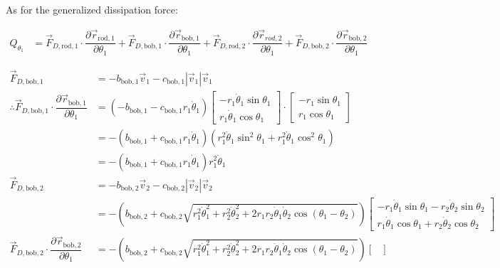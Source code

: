 \documentclass[12pt,a4paper,portrait]{article}
\begin{document}
	As for the generalized dissipation force:
	
	\begin{align*}
		Q_{\theta_1} &= \vec{F}_{D, \mathrm{rod}, 1} \cdot \dfrac{\partial \vec{r}_{\mathrm{rod},1}}{\partial \theta_1} + \vec{F}_{D, \mathrm{bob}, 1} \cdot \dfrac{\partial \vec{r}_{\mathrm{bob},1}}{\partial \theta_1}+ \vec{F}_{D, \mathrm{rod}, 2} \cdot \dfrac{\partial \vec{r}_{rod, 2}}{\partial \theta_1} + \vec{F}_{D, \mathrm{bob}, 2} \cdot \dfrac{\partial \vec{r}_{\mathrm{bob}, 2}}{\partial \theta_1}
	\end{align*}
	
	\begin{align*}
		\vec{F}_{D,\mathrm{bob}, 1} &= -b_{\mathrm{bob}, 1}\vec{v}_1 - c_{\mathrm{bob}, 1}|\vec{v}_1|\vec{v}_1\\
		\therefore \vec{F}_{D, \mathrm{bob}, 1} \cdot \dfrac{\partial \vec{r}_{\mathrm{bob},1}}{\partial \theta_1}&= (-b_{\mathrm{bob}, 1} - c_{\mathrm{bob}, 1}r_1\dot{\theta}_1)\begin{bmatrix}
			-r_1\dot{\theta}_1 \sin{\theta_1} \\
			r_1\dot{\theta}_1 \cos{\theta_1}
			\end{bmatrix} \cdot \begin{bmatrix}
			-r_1 \sin{\theta_1} \\
			r_1 \cos{\theta_1}
		\end{bmatrix} \\
		&= -(b_{\mathrm{bob}, 1}+c_{\mathrm{bob}, 1}r_1\dot{\theta}_1) (r_1^2 \dot{\theta}_1 \sin^2{\theta_1}+r_1^2 \dot{\theta}_1 \cos^2{\theta_1}) \\
		&= -(b_{\mathrm{bob}, 1} + c_{\mathrm{bob}, 1} r_1 \dot{\theta}_1)r_1^2 \dot{\theta}_1 \\
		\vec{F}_{D,\mathrm{bob, 2}} &= -b_{\mathrm{bob}, 2}\vec{v}_2 - c_{\mathrm{bob}, 2}|\vec{v}_2|\vec{v}_2 \\
		&= -\left(b_{\mathrm{bob}, 2}+c_{\mathrm{bob}, 2}\sqrt{r_1^2 \dot{\theta}_1^2 + r_2^2 \dot{\theta}_2^2 +2r_1 r_2\dot{\theta}_1 \dot{\theta}_2 \cos{(\theta_1-\theta_2)}}\right) \begin{bmatrix}
			-r_1\dot{\theta}_1 \sin{\theta_1}-r_2\dot{\theta}_2 \sin{\theta_2} \\
			r_1\dot{\theta}_1 \cos{\theta_1}+r_2\dot{\theta}_2 \cos{\theta_2}
		\end{bmatrix} \\
		\vec{F}_{D, \mathrm{bob}, 2} \cdot \dfrac{\partial \vec{r}_{\mathrm{bob},2}}{\partial \theta_1} &= -\left(b_{\mathrm{bob}, 2}+c_{\mathrm{bob}, 2}\sqrt{r_1^2 \dot{\theta}_1^2 + r_2^2 \dot{\theta}_2^2 +2r_1 r_2\dot{\theta}_1 \dot{\theta}_2 \cos{(\theta_1-\theta_2)}}\right) \begin{bmatrix}

\end{bmatrix}
\end{align*}
\end{document}
